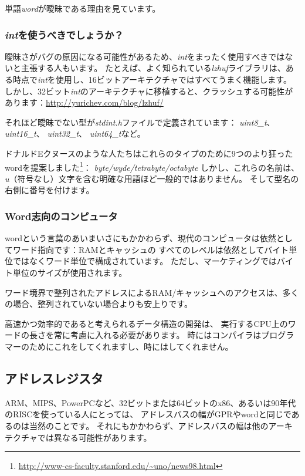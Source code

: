 単語\emph{word}が曖昧である理由を見ています。

\subsubsection{\emph{int}を使うべきでしょうか？}

曖昧さがバグの原因になる可能性があるため、\emph{int}をまったく使用すべきではないと主張する人もいます。 
たとえば、よく知られている\emph{lzhuf}ライブラリは、ある時点で\emph{int}を使用し、16ビットアーキテクチャではすべてうまく機能します。
しかし、32ビット\emph{int}のアーキテクチャに移植すると、クラッシュする可能性があります：\url{http://yurichev.com/blog/lzhuf/}

それほど曖昧でない型が\emph{stdint.h}ファイルで定義されています：
\emph{uint8\_t}、 \emph{uint16\_t}、 \emph{uint32\_t}、 \emph{uint64\_t}など。

ドナルドEクヌースのような人たちはこれらのタイプのために9つのより狂ったwordを提案しました\footnote{\url{http://www-cs-faculty.stanford.edu/~uno/news98.html}}：
\emph{byte/wyde/tetrabyte/octabyte}
しかし、これらの名前は、\emph{u}（符号なし）文字を含む明確な用語ほど一般的ではありません。
そして型名の右側に番号を付けます。

\subsubsection{Word志向のコンピュータ}

\gls{word}という言葉のあいまいさにもかかわらず、現代のコンピュータは依然としてワード指向です：\ac{RAM}とキャッシュの
すべてのレベルは依然としてバイト単位ではなくワード単位で構成されています。 
ただし、マーケティングではバイト単位のサイズが使用されます。

ワード境界で整列されたアドレスによるRAM/キャッシュへのアクセスは、多くの場合、整列されていない場合よりも安上りです。

高速かつ効率的であると考えられるデータ構造の開発は、
実行するCPU上のワードの長さを常に考慮に入れる必要があります。 
時にはコンパイラはプログラマーのためにこれをしてくれますし、時にはしてくれません。

\subsection{アドレスレジスタ}

ARM、MIPS、PowerPCなど、32ビットまたは64ビットのx86、あるいは90年代のRISCを使っている人にとっては、
アドレスバスの幅が\ac{GPR}や\gls{word}と同じであるのは当然のことです。 
それにもかかわらず、アドレスバスの幅は他のアーキテクチャでは異なる可能性があります。

